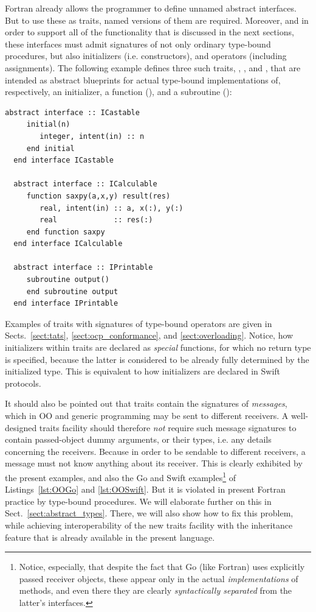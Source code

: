 \documentclass[11pt,oneside]{report}
\newcommand{\code}[1]{{\selectfont\ttfamily{#1}}}
\begin{document}
Fortran already allows the programmer to define unnamed abstract
interfaces. But to use these as traits, named versions of them are
required. Moreover, and in order to support all of the functionality
that is discussed in the next sections, these interfaces must admit
signatures of not only ordinary type-bound procedures, but also
initializers (i.e. constructors), and operators (including
assignments). The following example defines three such traits,
\code{ICastable}, \code{ICalculable}, and \code{IPrintable}, that are
intended as abstract blueprints for actual type-bound implementations
of, respectively, an initializer, a function (\code{saxpy}), and a
subroutine (\code{output}):
\begin{lstlisting}[language=LFortran,style=boxed]
  abstract interface :: ICastable
     initial(n)
        integer, intent(in) :: n
     end initial
  end interface ICastable

  abstract interface :: ICalculable
     function saxpy(a,x,y) result(res)
        real, intent(in) :: a, x(:), y(:)
        real             :: res(:)
     end function saxpy
  end interface ICalculable

  abstract interface :: IPrintable
     subroutine output()
     end subroutine output
  end interface IPrintable
\end{lstlisting}
Examples of traits with signatures of type-bound operators are given
in Sects.~\ref{sect:tats}, \ref{sect:ocp_conformance}, and
\ref{sect:overloading}. Notice, how initializers within traits are
declared as \emph{special} functions, for which no return type is
specified, because the latter is considered to be already fully
determined by the initialized type. This is equivalent to how
initializers are declared in Swift protocols.

It should also be pointed out that traits contain the signatures of
\emph{messages}, which in OO and generic programming may be sent to
different receivers. A well-designed traits facility should therefore
\emph{not} require such message signatures to contain passed-object
dummy arguments, or their types, i.e. any details concerning the
receivers. Because in order to be sendable to different receivers, a
message must not know anything about its receiver. This is clearly
exhibited by the present examples, and also the Go and Swift
examples\footnote{Notice, especially, that despite the fact that Go
(like Fortran) uses explicitly passed receiver objects, these appear
only in the actual \emph{implementations} of methods, and even there
they are clearly \emph{syntactically separated} from the latter's
interfaces.} of Listings~\ref{lst:OOGo} and \ref{lst:OOSwift}. But it
is violated in present Fortran practice by \code{deferred} type-bound
procedures. We will elaborate further on this in
Sect.~\ref{sect:abstract_types}. There, we will also show how to fix
this problem, while achieving interoperability of the new traits
facility with the inheritance feature that is already available in the
present language.
\end{document}
